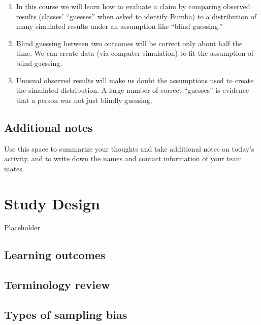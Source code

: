 \documentclass[
]{report}
\begin{document}
\begin{enumerate}
\def\labelenumi{\arabic{enumi}.}
\item
  In this course we will learn how to evaluate a claim by comparing observed results (classes' ``guesses'' when asked to identify Bumba) to a distribution of many simulated results under an assumption like ``blind guessing.''
\item
  Blind guessing between two outcomes will be correct only about half the time. We can create data (via computer simulation) to fit the assumption of blind guessing.
\item
  Unusual observed results will make us doubt the assumptions used to create the simulated distribution. A large number of correct ``guesses'' is evidence that a person was not just blindly guessing.
\end{enumerate}

\hypertarget{additional-notes}{%
\section{Additional notes}\label{additional-notes}}

Use this space to summarize your thoughts and take additional notes on today's activity, and to write down the names and contact information of your team mates.

\hypertarget{study-design}{%
\chapter{Study Design}\label{study-design}}

Placeholder

\hypertarget{learning-outcomes}{%
\section{Learning outcomes}\label{learning-outcomes}}

\hypertarget{terminology-review}{%
\section{Terminology review}\label{terminology-review}}

\hypertarget{types-of-sampling-bias}{%
\section{Types of sampling bias}\label{types-of-sampling-bias}}
\end{document}

